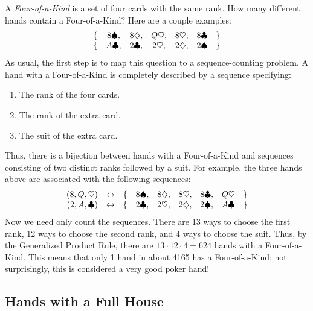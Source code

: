 A \emph{Four-of-a-Kind} is a set of four cards with the same rank.
How many different hands contain a Four-of-a-Kind?  Here are a couple
examples:
%
\[
\begin{array}{rcccccl}
\{ & 8 \spadesuit, & 8 \diamondsuit, & Q \heartsuit, & 8 \heartsuit, & 8 \clubsuit & \} \\
\{ & A \clubsuit, & 2 \clubsuit, & 2 \heartsuit, & 2 \diamondsuit, & 2 \spadesuit & \} \\
\end{array}
\]
%
As usual, the first step is to map this question to a
sequence-counting problem.  A hand with a Four-of-a-Kind is completely
described by a sequence specifying:
%
\begin{enumerate}
\item The rank of the four cards.
\item The rank of the extra card.
\item The suit of the extra card.
\end{enumerate}
%
Thus, there is a bijection between hands with a Four-of-a-Kind and
sequences consisting of two distinct ranks followed by a suit.  For
example, the three hands above are associated with the following
sequences:
%
\[
\begin{array}{rccccclcl}
(8, Q, \heartsuit) & \leftrightarrow &
  \{ & 8 \spadesuit, & 8 \diamondsuit, & 8 \heartsuit, & 8 \clubsuit, & Q \heartsuit & \} \\
(2, A, \clubsuit) & \leftrightarrow &
  \{ & 2 \clubsuit, & 2 \heartsuit, & 2 \diamondsuit, & 2 \spadesuit, & A \clubsuit & \} \\
\end{array}
\]
%
Now we need only count the sequences.  There are 13 ways to choose the
first rank, 12 ways to choose the second rank, and 4 ways to choose
the suit.  Thus, by the Generalized Product Rule, there are $13 \cdot
12 \cdot 4 = 624$ hands with a Four-of-a-Kind.  This means that only 1
hand in about 4165 has a Four-of-a-Kind; not surprisingly, this is
considered a very good poker hand!

\subsection{Hands with a Full House}

